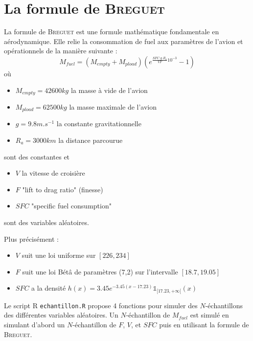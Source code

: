 \documentclass{book}
\begin{document}
\appendix

\chapter{La formule de \textsc{Breguet}}
La formule de \textsc{Breguet} est une formule mathématique fondamentale en aérodynamique. Elle relie la consommation de fuel aux paramètres de l'avion et opérationnels de la manière suivante :
\[M_{fuel}=(M_{empty}+M_{pload})\left(e^{\frac{SFC.g.R_a}{VF}10^{-3}}-1\right)\]
où
\begin{itemize}
\item $M_{empty}=42600kg$ la masse à vide de l'avion
\item $M_{pload}=62500kg$ la masse maximale de l'avion
\item $g=9.8m.s^{-1}$ la constante gravitationnelle 
\item $R_a=3000km$ la distance parcourue
\end{itemize}
sont des constantes
et 
\begin{itemize}
\item $V$ la vitesse de croisière
\item $F$ "lift to drag ratio" (finesse)
\item $SFC$ "specific fuel consumption" 
\end{itemize}
sont des variables aléatoires.

\vspace{1\baselineskip}
Plus précisément :
\begin{itemize}
\item $V$ suit une loi uniforme sur $[226, 234]$
\item $F$ suit une loi Bétâ de paramètres (7,2) sur l'intervalle $[18.7, 19.05]$
\item $SFC$ a la densité $h(x)=3.45e^{-3.45(x-17.23)}\mathds{1}_{[17.23,+\infty[}(x)$
\end{itemize}
\vspace{1\baselineskip}

Le script R \texttt{echantillon.R} propose 4 fonctions pour simuler des $N$-échantillons des différentes variables aléatoires. Un $N$-échantillon de $M_{fuel}$ est simulé en simulant d'abord un $N$-échantillon de $F$, $V$, et $SFC$ puis en utilisant la formule de \textsc{Breguet}.
\end{document}
